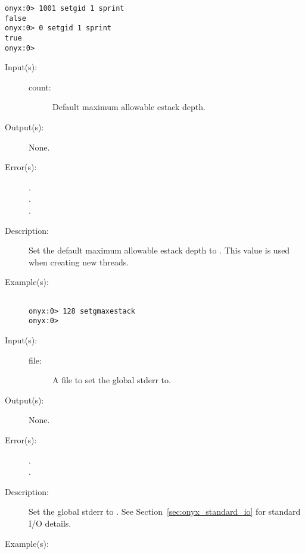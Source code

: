 \begin{description}
\begin{description}
\begin{verbatim}
onyx:0> 1001 setgid 1 sprint
false
onyx:0> 0 setgid 1 sprint
true
onyx:0>
		\end{verbatim}
	\end{description}
\label{systemdict:setgmaxestack}
\item[{\onyxop{count}{setgmaxestack}{--}}: ]
	\begin{description}\item[]
	\item[Input(s): ]
		\begin{description}\item[]
		\item[count: ]
			Default maximum allowable estack depth.
		\end{description}
	\item[Output(s): ] None.
	\item[Error(s): ]
		\begin{description}\item[]
		\item[.]
		\item[.]
		\item[.]
		\end{description}
	\item[Description: ]
		Set the default maximum allowable estack depth to .
		This value is used when creating new threads.
	\item[Example(s): ]\begin{verbatim}

onyx:0> 128 setgmaxestack
onyx:0>
		\end{verbatim}
	\end{description}
\label{systemdict:setgstderr}
\item[{\onyxop{file}{setgstderr}{--}}: ]
	\begin{description}\item[]
	\item[Input(s): ]
		\begin{description}\item[]
		\item[file: ]
			A file to set the global stderr to.
		\end{description}
	\item[Output(s): ] None.
	\item[Error(s): ]
		\begin{description}\item[]
		\item[.]
		\item[.]
		\end{description}
	\item[Description: ]
		Set the global stderr to .  See
		Section~\ref{sec:onyx_standard_io} for standard I/O details.
	\item[Example(s): ]\begin{verbatim}


\end{verbatim}
\end{description}
\end{description}
